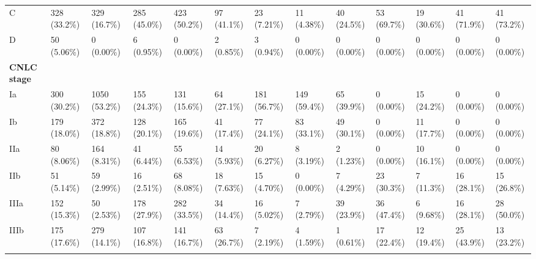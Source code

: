 \documentclass{article}
\begin{document}
\begin{landscape}
\begin{tiny}
\begin{tabularx}{\linewidth}{p{2.0cm}|X|X|X|X|X|X|X|X|X|X|X|X}
\rowcolor{gray!10}
    C &   328 (33.2\%)    &   329 (16.7\%)    &   285 (45.0\%)    &   423 (50.2\%)    &    97 (41.1\%)    &    23 (7.21\%)    &    11 (4.38\%)    &    40 (24.5\%)    &    53 (69.7\%)    &    19 (30.6\%)    &    41 (71.9\%)    &    41 (73.2\%)    \\
\rowcolor{gray!10}
    D &    50 (5.06\%)    &    0 (0.00\%)     &    6 (0.95\%)     &    0 (0.00\%)     &    2 (0.85\%)     &    3 (0.94\%)     &    0 (0.00\%)     &    0 (0.00\%)     &    0 (0.00\%)     &    0 (0.00\%)     &    0 (0.00\%)     &    0 (0.00\%)     \\
\rowcolor{gray!30}
\textbf{CNLC stage }  &  &  &  &  &  &  &  &  &  &  &  &  \\
\rowcolor{gray!10}
    Ia &   300 (30.2\%)    &   1050 (53.2\%)   &   155 (24.3\%)    &   131 (15.6\%)    &    64 (27.1\%)    &   181 (56.7\%)    &   149 (59.4\%)    &    65 (39.9\%)    &    0 (0.00\%)     &    15 (24.2\%)    &    0 (0.00\%)     &    0 (0.00\%)     \\
\rowcolor{gray!10}
    Ib &   179 (18.0\%)    &   372 (18.8\%)    &   128 (20.1\%)    &   165 (19.6\%)    &    41 (17.4\%)    &    77 (24.1\%)    &    83 (33.1\%)    &    49 (30.1\%)    &    0 (0.00\%)     &    11 (17.7\%)    &    0 (0.00\%)     &    0 (0.00\%)     \\
\rowcolor{gray!10}
    IIa &    80 (8.06\%)    &   164 (8.31\%)    &    41 (6.44\%)    &    55 (6.53\%)    &    14 (5.93\%)    &    20 (6.27\%)    &    8 (3.19\%)     &    2 (1.23\%)     &    0 (0.00\%)     &    10 (16.1\%)    &    0 (0.00\%)     &    0 (0.00\%)     \\
\rowcolor{gray!10}
    IIb &    51 (5.14\%)    &    59 (2.99\%)    &    16 (2.51\%)    &    68 (8.08\%)    &    18 (7.63\%)    &    15 (4.70\%)    &    0 (0.00\%)     &    7 (4.29\%)     &    23 (30.3\%)    &    7 (11.3\%)     &    16 (28.1\%)    &    15 (26.8\%)    \\
\rowcolor{gray!10}
    IIIa &   152 (15.3\%)    &    50 (2.53\%)    &   178 (27.9\%)    &   282 (33.5\%)    &    34 (14.4\%)    &    16 (5.02\%)    &    7 (2.79\%)     &    39 (23.9\%)    &    36 (47.4\%)    &    6 (9.68\%)     &    16 (28.1\%)    &    28 (50.0\%)    \\
\rowcolor{gray!10}
    IIIb &   175 (17.6\%)    &   279 (14.1\%)    &   107 (16.8\%)    &   141 (16.7\%)    &    63 (26.7\%)    &    7 (2.19\%)     &    4 (1.59\%)     &    1 (0.61\%)     &    17 (22.4\%)    &    12 (19.4\%)    &    25 (43.9\%)    &    13 (23.2\%)    \\
\rowcolor{gray!10}

\end{tabularx}
\end{tiny}
\end{landscape}
\end{document}
